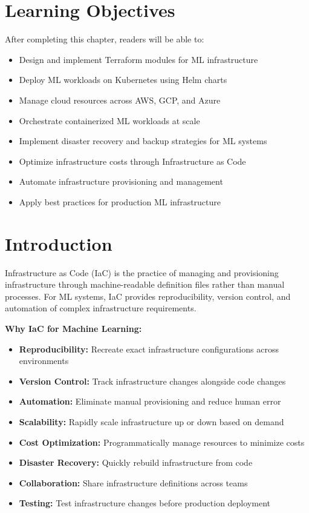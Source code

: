\section{Learning Objectives}

After completing this chapter, readers will be able to:
\begin{itemize}
    \item Design and implement Terraform modules for ML infrastructure
    \item Deploy ML workloads on Kubernetes using Helm charts
    \item Manage cloud resources across AWS, GCP, and Azure
    \item Orchestrate containerized ML workloads at scale
    \item Implement disaster recovery and backup strategies for ML systems
    \item Optimize infrastructure costs through Infrastructure as Code
    \item Automate infrastructure provisioning and management
    \item Apply best practices for production ML infrastructure
\end{itemize}

\section{Introduction}

Infrastructure as Code (IaC) is the practice of managing and provisioning infrastructure through machine-readable definition files rather than manual processes. For ML systems, IaC provides reproducibility, version control, and automation of complex infrastructure requirements.

\textbf{Why IaC for Machine Learning:}

\begin{itemize}
    \item \textbf{Reproducibility:} Recreate exact infrastructure configurations across environments
    \item \textbf{Version Control:} Track infrastructure changes alongside code changes
    \item \textbf{Automation:} Eliminate manual provisioning and reduce human error
    \item \textbf{Scalability:} Rapidly scale infrastructure up or down based on demand
    \item \textbf{Cost Optimization:} Programmatically manage resources to minimize costs
    \item \textbf{Disaster Recovery:} Quickly rebuild infrastructure from code
    \item \textbf{Collaboration:} Share infrastructure definitions across teams
    \item \textbf{Testing:} Test infrastructure changes before production deployment
\end{itemize}

